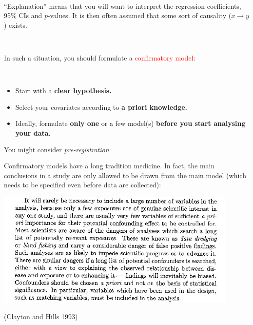 \documentclass[
  10pt,
  ignorenonframetext,
]{beamer}
\begin{document}
\begin{frame}
\(~\)

``Explanation'' means that you will want to interpret the regression
coefficients, 95\% CIs and \(p\)-values. It is then often assumed that
some sort of causality (\(x\rightarrow y\)) exists.

\(~\)

In such a situation, you should formulate a
\textcolor{red}{confirmatory model}:

\(~\)

\begin{tcolorbox}
\begin{itemize}
\item Start with a {\bf clear hypothesis.}

\vspace{2mm}

\item Select your covariates according to {\bf a priori knowledge.}

\vspace{2mm}

\item Ideally, formulate {\bf only one} or a few model(s) {\bf before you start analysing your data}.
\end{itemize}

\end{tcolorbox}

\vspace{8mm}

You might consider \emph{pre-registration}.
\end{frame}

\begin{frame}
Confirmatory models have a long tradition medicine. In fact, the main
conclusions in a study are only allowed to be drawn from the main model
(which needs to be specified even before data are collected):

\vspace{2mm}

\includegraphics[width=0.9\textwidth,height=\textheight]{graphics/claytonHills.jpg}
\(~\)

\scriptsize (Clayton and Hills 1993)
\end{frame}
\end{document}
